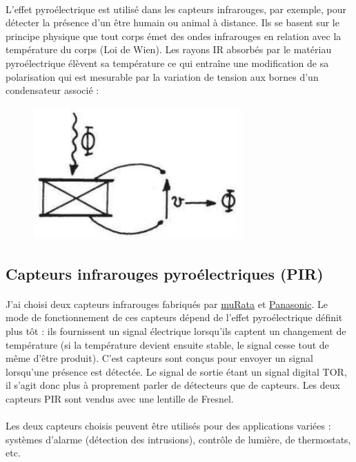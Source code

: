 \documentclass{article}
\begin{document}
    \paragraph{}
    L'effet pyroélectrique est utilisé dans les capteurs infrarouges, par exemple, pour détecter la présence d'un être humain ou animal à distance. Ils se basent sur le principe physique que tout corps émet des ondes infrarouges en relation avec la température du corps (Loi de Wien). Les rayons IR absorbés par le matériau pyroélec­trique élèvent sa température ce qui entraîne une modification de sa polarisation qui est mesurable par la variation de tension aux bornes d'un condensateur associé :
    \begin{figure}[H]
        \centering
        \includegraphics[width=0.2\linewidth]{./images/effet-pyro.png}
    \end{figure}

        \subsection{Capteurs infrarouges pyroélectriques (PIR)}
        \paragraph{}
    J'ai choisi deux capteurs infrarouges fabriqués par \href{https://www.murata.com/}{muRata} et \href{https://www.panasonic-electric-works.com/be/}{Panasonic}. Le mode de fonctionnement de ces capteurs dépend de l'effet pyroélectrique définit plus tôt : ils fournissent un signal électrique lorsqu'ils captent un changement de température (si la température devient ensuite stable, le signal cesse tout de même d'être produit). C'est capteurs sont conçus pour envoyer un signal lorsqu'une présence est détectée. Le signal de sortie étant un signal digital TOR, il s'agit donc plus à proprement parler de détecteurs que de capteurs. Les deux capteurs PIR sont vendus avec une lentille de Fresnel.
    
        \paragraph{}
        Les deux capteurs choisis peuvent être utilisés pour des applications variées : systèmes d'alarme (détection des intrusions), contrôle de lumière, de thermostats, etc.
\end{document}
